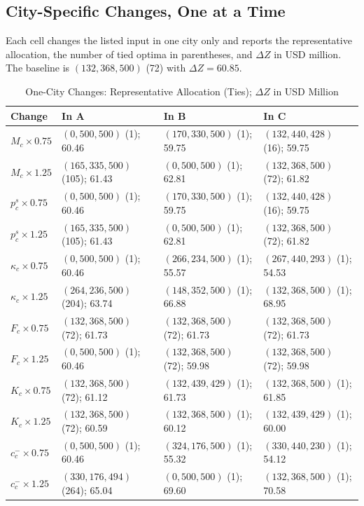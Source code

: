 \documentclass[10pt,a4paper]{article}
\begin{document}
\subsection{City-Specific Changes, One at a Time}\label{sec:an-city}
Each cell changes the listed input in one city only and reports the representative allocation, the number of tied optima in parentheses, and $\Delta Z$ in USD million. The baseline is $(132,368,500)$ (72) with $\Delta Z=60.85$.
\begin{table}[H]
\centering\footnotesize
\caption{One-City Changes: Representative Allocation (Ties); $\Delta Z$ in USD Million}\label{tab:an-city}
\begin{tabular}{lP{.27\linewidth}P{.27\linewidth}P{.27\linewidth}}
\toprule
Change & In A & In B & In C\\\midrule
$M_c\times0.75$ & $(0,500,500)$ (1); 60.46 & $(170,330,500)$ (1); 59.75 & $(132,440,428)$ (16); 59.75\\
$M_c\times1.25$ & $(165,335,500)$ (105); 61.43 & $(0,500,500)$ (1); 62.81 & $(132,368,500)$ (72); 61.82\\
$p_c^s\times0.75$ & $(0,500,500)$ (1); 60.46 & $(170,330,500)$ (1); 59.75 & $(132,440,428)$ (16); 59.75\\
$p_c^s\times1.25$ & $(165,335,500)$ (105); 61.43 & $(0,500,500)$ (1); 62.81 & $(132,368,500)$ (72); 61.82\\
$\kappa_c\times0.75$ & $(0,500,500)$ (1); 60.46 & $(266,234,500)$ (1); 55.57 & $(267,440,293)$ (1); 54.53\\
$\kappa_c\times1.25$ & $(264,236,500)$ (204); 63.74 & $(148,352,500)$ (1); 66.88 & $(132,368,500)$ (1); 68.95\\
$F_c\times0.75$ & $(132,368,500)$ (72); 61.73 & $(132,368,500)$ (72); 61.73 & $(132,368,500)$ (72); 61.73\\
$F_c\times1.25$ & $(0,500,500)$ (1); 60.46 & $(132,368,500)$ (72); 59.98 & $(132,368,500)$ (72); 59.98\\
$K_c\times0.75$ & $(132,368,500)$ (72); 61.12 & $(132,439,429)$ (1); 61.73 & $(132,368,500)$ (1); 61.85\\
$K_c\times1.25$ & $(132,368,500)$ (72); 60.59 & $(132,368,500)$ (1); 60.12 & $(132,439,429)$ (1); 60.00\\
$c_c^-\times0.75$ & $(0,500,500)$ (1); 60.46 & $(324,176,500)$ (1); 55.32 & $(330,440,230)$ (1); 54.12\\
$c_c^-\times1.25$ & $(330,176,494)$ (264); 65.04 & $(0,500,500)$ (1); 69.60 & $(132,368,500)$ (1); 70.58\\

\end{tabular}
\end{table}
\end{document}
